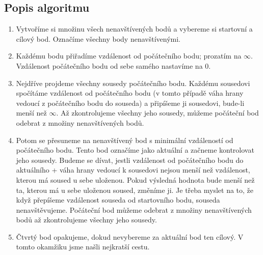 \subsection{Popis algoritmu}
\label{subsec:popis-algoritmu}

\begin{enumerate}
    \item Vytvoříme si množinu všech nenavštívených bodů a vybereme si startovní a cílový bod. Označíme všechny body nenavštívenými. 
    \item Každému bodu přiřadíme vzdálenost od počátečního bodu; prozatím na $\infty$. Vzdálenost počátečního bodu od sebe samého nastavíme na $0$. 
    \item Nejdříve projdeme všechny sousedy počátečního bodu. Každému sousedovi spočítáme vzdálenost od počátečního bodu (v tomto případě váha hrany vedoucí z počátečního bodu do souseda) a připíšeme ji sousedovi, bude-li menší než $\infty$. Až zkontrolujeme všechny jeho sousedy, můžeme počáteční bod odebrat z množiny nenavštívených bodů.
    \item Potom se přesuneme na nenavštívený bod s minimální vzdáleností od počátečního bodu. 
    Tento bod označíme jako aktuální a začneme kontrolovat jeho sousedy. Budeme se dívat, jestli vzdálenost od počátečního bodu do aktuálního + váha hrany vedoucí k sousedovi nejsou menší než vzdálenost, kterou má soused u sebe uloženou. Pokud výsledná hodnota bude menší než ta, kterou má u sebe uloženou soused, změníme ji. Je třeba myslet na to, že když přepíšeme vzdálenost souseda od startovního bodu, souseda nenavštěvujeme. Počáteční bod můžeme odebrat z množiny nenavštívených bodů až zkontrolujeme všechny jeho sousedy.
    \item Čtvrtý bod opakujeme, dokud nevybereme za aktuální bod ten cílový. V tomto okamžiku jsme našli nejkratší cestu.
\end{enumerate}